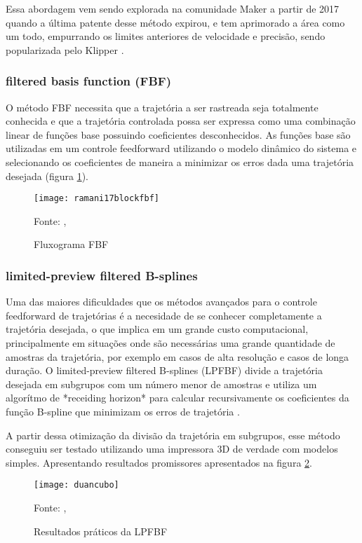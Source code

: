 Essa abordagem vem sendo explorada na comunidade Maker a partir de 2017 
quando a última patente desse método expirou, e tem aprimorado a área como
um todo, empurrando os limites anteriores de velocidade e precisão,
sendo popularizada pelo Klipper \cite{klipperkinematic}.

\subsubsection{filtered basis function (FBF)}
O método FBF necessita que a trajetória a ser rastreada seja totalmente
conhecida e que a trajetória controlada possa ser expressa como
uma combinação linear de funções base possuindo coeficientes desconhecidos.
As funções base são utilizadas em um controle feedforward utilizando
o modelo dinâmico do sistema e selecionando os coeficientes de maneira a
minimizar os erros dada uma trajetória desejada (figura \ref{fig:flowchart_fbf}).
\cite{ramani17}

\begin{figure}[!htb]
    \centering
    \caption{Fluxograma FBF}
    \texttt{[image: ramani17blockfbf]}

    {\footnotesize Fonte: \citeauthor{ramani17}, \citeyear{ramani17}}
    \label{fig:flowchart_fbf}
\end{figure}

\subsubsection{limited-preview filtered B-splines}
Uma das maiores dificuldades que os métodos avançados para o
controle feedforward de trajetórias é a necesidade de se conhecer
completamente a trajetória desejada, o que implica em um grande custo
computacional, principalmente em situações onde são necessárias uma
grande quantidade de amostras da trajetória, por exemplo em casos de alta resolução
e casos de longa duração.
O limited-preview filtered B-splines (LPFBF) divide a trajetória desejada em subgrupos
com um número menor de amostras e utiliza um algorítmo de *receiding horizon* para
calcular recursivamente os coeficientes da função B-spline que minimizam os erros
de trajetória \cite{duan18}.

A partir dessa otimização da divisão da trajetória em subgrupos, esse método
conseguiu ser testado utilizando uma impressora 3D de verdade com modelos simples.
Apresentando resultados promissores apresentados na figura \ref{fig:duancubo}.

\begin{figure}[!htb]
    \centering
    \caption{Resultados práticos da LPFBF}
    \texttt{[image: duancubo]}

    {\footnotesize Fonte: \citeauthor{duan18}, \citeyear{duan18}}
    \label{fig:duancubo}
\end{figure}

